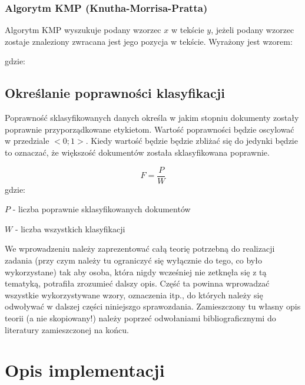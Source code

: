 \documentclass{classrep}
\begin{document}
\subsubsection{Algorytm KMP (Knutha-Morrisa-Pratta)}
Algorytm KMP wyszukuje podany wzorzec $x$ w tekście $y$, jeżeli podany wzorzec zostaje znaleziony zwracana jest jego
pozycja w tekście. Wyrażony jest wzorem:

gdzie:\\
\begin{description}
    \item
    \item
    \item
\end{description}

\subsection{Określanie poprawności klasyfikacji}
Poprawność sklasyfikowanych danych określa w jakim stopniu dokumenty zostały poprawnie przyporządkowane etykietom.
Wartość poprawności będzie oscylować w przedziale $<0;1>$. Kiedy wartość będzie będzie zbliżać się do jedynki będzie
to oznaczać, że większość dokumentów została sklasyfikowana poprawnie.

\begin{equation}
    F=\frac{P}{W}
\end{equation}
gdzie:\\
\begin{description}
    \item $P$ - liczba poprawnie sklasyfikowanych dokumentów
    \item $W$ - liczba wszystkich klasyfikacji
\end{description}

{\color{blue}
We wprowadzeniu należy zaprezentować całą teorię potrzebną do realizacji
zadania (przy czym należy tu ograniczyć się wyłącznie do tego, co było
wykorzystane) tak aby osoba, która nigdy wcześniej nie zetknęła się z tą
tematyką, potrafiła zrozumieć dalszy opis. Część ta powinna wprowadzać
wszystkie wykorzystywane wzory, oznaczenia itp., do których należy się
odwoływać w dalszej części niniejszgo sprawozdania. Zamieszczony tu własny
opis teorii (a nie skopiowany!) należy poprzeć odwołaniami bibliograficznymi
do literatury zamieszczonej na końcu. }

\section{Opis implementacji}
\end{document}
